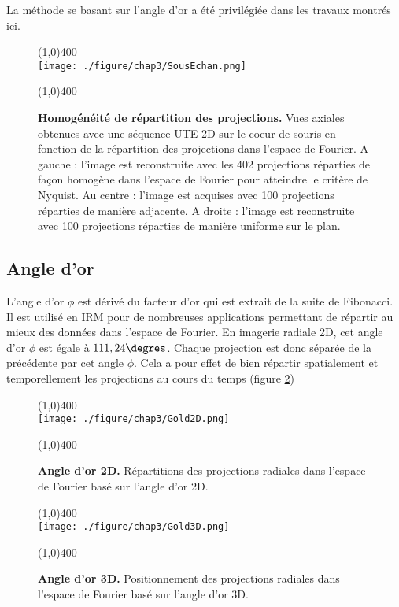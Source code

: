 La méthode se basant sur l’angle d’or a été privilégiée dans les travaux montrés ici.

\begin{figure}[H]
\centering
\line(1,0){400} \\
\texttt{[image: ./figure/chap3/SousEchan.png]}
\caption[Homogénéité de répartition des projections.]{\label{fig:SousEchan} \textbf{Homogénéité de répartition des projections.} Vues axiales obtenues avec une séquence UTE 2D sur le coeur de souris en fonction de la répartition des projections dans l'espace de Fourier. A gauche : l'image est reconstruite avec les 402 projections réparties de façon homogène dans l'espace de Fourier pour atteindre le critère de Nyquist. Au centre : l'image est acquises avec 100 projections réparties de manière adjacente. A droite : l'image est reconstruite avec 100 projections réparties de manière uniforme sur le plan.}
\line(1,0){400} \\ \end{figure}

\subsection{Angle d'or}

L'angle d'or $\phi$ est dérivé du facteur d'or qui est extrait de la suite de Fibonacci. Il est utilisé en IRM pour de nombreuses applications permettant de répartir au mieux des données dans l'espace de Fourier. En imagerie radiale 2D, cet angle d'or $\phi$ est égale à $111,24 \degres$. Chaque projection est donc séparée de la précédente par cet angle $\phi$. Cela a pour effet de bien répartir spatialement et temporellement les projections au cours du temps (figure \ref{fig:Gold2D})

\begin{figure}[h]
\centering \line(1,0){400} \\
\texttt{[image: ./figure/chap3/Gold2D.png]}
\caption[Angle d'or 2D.]{\label{fig:Gold2D} \textbf{Angle d'or 2D.}  Répartitions des projections radiales dans l'espace de Fourier basé sur l'angle d'or 2D.}
\line(1,0){400} \\ \end{figure}

\begin{figure}[h]
\centering \line(1,0){400} \\
\texttt{[image: ./figure/chap3/Gold3D.png]}
\caption[Angle d'or 3D.]{\label{fig:Gold3D} \textbf{Angle d'or 3D.} Positionnement des projections radiales dans l'espace de Fourier basé sur l'angle d'or 3D.}
\line(1,0){400} \\ \end{figure}

